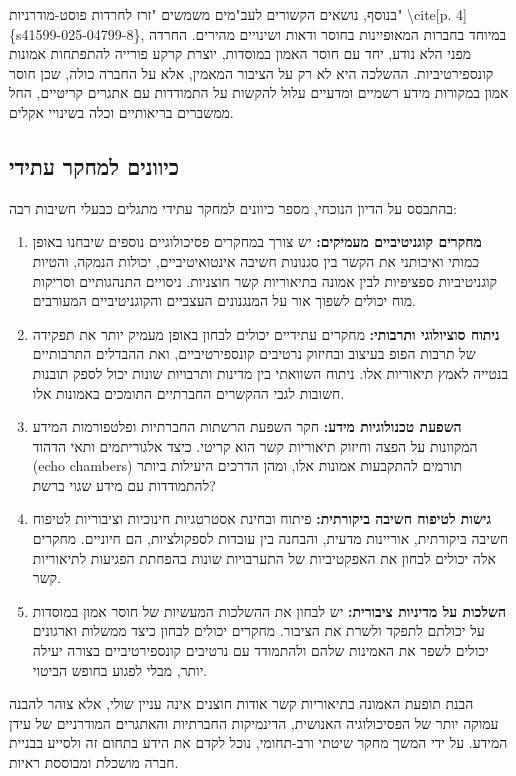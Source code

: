 \documentclass[12pt,a4paper]{article}
\begin{document}
בנוסף, נושאים הקשורים לעב"מים משמשים "זרז לחרדות פוסט-מודרניות" \textbackslash{}cite[p. 4]\{s41599-025-04799-8\}, במיוחד בחברות המאופיינות בחוסר ודאות ושינויים מהירים. החרדה מפני הלא נודע, יחד עם חוסר האמון במוסדות, יוצרת קרקע פורייה להתפתחות אמונות קונספירטיביות. ההשלכה היא לא רק על הציבור המאמין, אלא על החברה כולה, שכן חוסר אמון במקורות מידע רשמיים ומדעיים עלול להקשות על התמודדות עם אתגרים קריטיים, החל ממשברים בריאותיים וכלה בשינויי אקלים.

\subsection{כיוונים למחקר עתידי}
בהתבסס על הדיון הנוכחי, מספר כיוונים למחקר עתידי מתגלים כבעלי חשיבות רבה:

\begin{enumerate}
    \item \textbf{מחקרים קוגניטיביים מעמיקים:} יש צורך במחקרים פסיכולוגיים נוספים שיבחנו באופן כמותי ואיכותני את הקשר בין סגנונות חשיבה אינטואיטיביים, יכולות הנמקה, והטיות קוגניטיביות ספציפיות לבין אמונה בתיאוריות קשר חוצניות. ניסויים התנהגותיים וסריקות מוח יכולים לשפוך אור על המנגנונים העצביים והקוגניטיביים המעורבים.
    \item \textbf{ניתוח סוציולוגי ותרבותי:} מחקרים עתידיים יכולים לבחון באופן מעמיק יותר את תפקידה של תרבות הפופ בעיצוב ובחיזוק נרטיבים קונספירטיביים, ואת ההבדלים התרבותיים בנטייה לאמץ תיאוריות אלו. ניתוח השוואתי בין מדינות ותרבויות שונות יכול לספק תובנות חשובות לגבי ההקשרים החברתיים התומכים באמונות אלו.
    \item \textbf{השפעת טכנולוגיות מידע:} חקר השפעת הרשתות החברתיות ופלטפורמות המידע המקוונות על הפצה וחיזוק תיאוריות קשר הוא קריטי. כיצד אלגוריתמים ותאי הדהוד (echo chambers) תורמים להתקבעות אמונות אלו, ומהן הדרכים היעילות ביותר להתמודדות עם מידע שגוי ברשת?
    \item \textbf{גישות לטיפוח חשיבה ביקורתית:} פיתוח ובחינת אסטרטגיות חינוכיות וציבוריות לטיפוח חשיבה ביקורתית, אוריינות מדעית, והבחנה בין עובדות לספקולציות, הם חיוניים. מחקרים אלה יכולים לבחון את האפקטיביות של התערבויות שונות בהפחתת הפגיעות לתיאוריות קשר.
    \item \textbf{השלכות על מדיניות ציבורית:} יש לבחון את ההשלכות המעשיות של חוסר אמון במוסדות על יכולתם לתפקד ולשרת את הציבור. מחקרים יכולים לבחון כיצד ממשלות וארגונים יכולים לשפר את האמינות שלהם ולהתמודד עם נרטיבים קונספירטיביים בצורה יעילה יותר, מבלי לפגוע בחופש הביטוי.
\end{enumerate}

הבנת תופעת האמונה בתיאוריות קשר אודות חוצנים אינה עניין שולי, אלא צוהר להבנה עמוקה יותר של הפסיכולוגיה האנושית, הדינמיקות החברתיות והאתגרים המודרניים של עידן המידע. על ידי המשך מחקר שיטתי ורב-תחומי, נוכל לקדם את הידע בתחום זה ולסייע בבניית חברה מושכלת ומבוססת ראיות.
\end{document}
